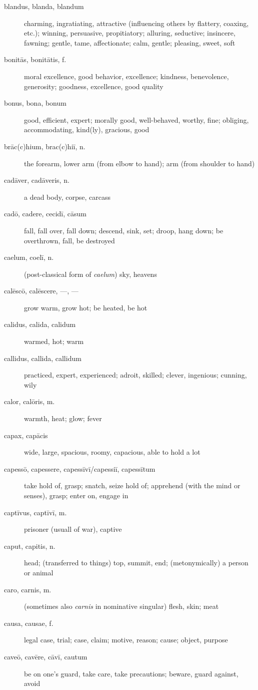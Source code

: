 \begin{description}
    \item[blandus, blanda, blandum] charming, ingratiating, attractive (influencing others by flattery, coaxing, etc.); winning, persuasive, propitiatory; alluring, seductive; insincere, fawning; gentle, tame, affectionate; calm, gentle; pleasing, sweet, soft
    \item[bonitās, bonitātis, f.] moral excellence, good behavior, excellence; kindness, benevolence, generosity; goodness, excellence, good quality
    \item[bonus, bona, bonum] good, efficient, expert; morally good, well-behaved, worthy, fine; obliging, accommodating, kind(ly), gracious, good
    \item[brāc(c)hium, brac(c)hiī, n.]  the forearm, lower arm (from elbow to hand); arm (from shoulder to hand)
    \item[cadāver, cadāveris, n.] a dead body, corpse, carcass
    \item[cadō, cadere, cecidī, cāsum] fall, fall over, fall down; descend, sink, set; droop, hang down; be overthrown, fall, be destroyed
    \item[caelum, coelī, n.] (post-classical form of \textit{caelum}) sky, heavens
    \item[calēscō, calēscere, ---, ---] grow warm, grow hot; be heated, be hot
    \item[calidus, calida, calidum] warmed, hot; warm
    \item[callidus, callida, callidum] practiced, expert, experienced; adroit, skilled; clever, ingenious; cunning, wily
    \item[calor, calōris, m.] warmth, heat; glow; fever
    \item[capax, capācis] wide, large, spacious, roomy, capacious, able to hold a lot
    \item[capessō, capessere, capessīvī/capessiī, capessītum] take hold of, grasp; snatch, seize hold of; apprehend (with the mind or senses), grasp; enter on, engage in
    \item[captīvus, captīvī, m.] prisoner (usuall of war), captive
    \item[caput, capitis, n.] head; (transferred to things) top, summit, end; (metonymically) a person or animal
    \item[caro, carnis, m.] (sometimes also \textit{carnis} in nominative singular) flesh, skin; meat
    \item[causa, causae, f.] legal case, trial; case, claim; motive, reason; cause; object, purpose
    \item[caveō, cavēre, cāvī, cautum] be on one's guard, take care, take precautions; beware, guard against, avoid

\end{description}
